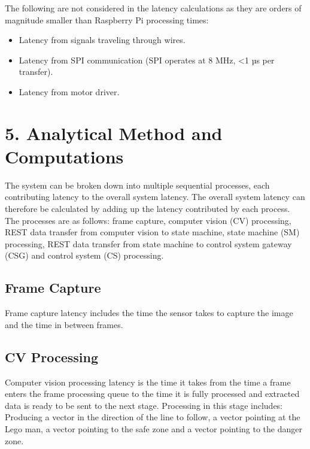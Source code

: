 \documentclass[11pt]{article}
\begin{document}
The following are not considered in the latency calculations as they are orders of magnitude smaller than Raspberry Pi processing times:
\begin{itemize}
    \item Latency from signals traveling through wires.
    \item Latency from SPI communication (SPI operates at 8 MHz, <1 µs per transfer).
    \item Latency from motor driver.
\end{itemize}

\vspace{1em}

\section*{5. Analytical Method and Computations}


The system can be broken down into multiple sequential processes, each contributing latency to the overall system latency. The overall 
system latency can therefore be calculated by adding up the latency contributed by each process.  
\\

The processes are as follows: frame capture, computer vision (CV) processing, REST data transfer from computer vision to state machine, state machine (SM) processing, REST data transfer from state machine to control system gateway (CSG) and control system (CS) processing.

\subsection{Frame Capture}
Frame capture latency includes the time the sensor takes to capture the image and the time in between frames. 
\subsection{CV Processing}
Computer vision processing latency is the time it takes from the time a frame enters the frame processing queue to the time it is fully processed and extracted data is ready to be sent to the next stage. 
Processing in this stage includes: Producing a vector in the direction of the line to follow, a vector pointing at the Lego man, a vector pointing to the safe zone and a vector pointing to the danger zone. 
\end{document}
